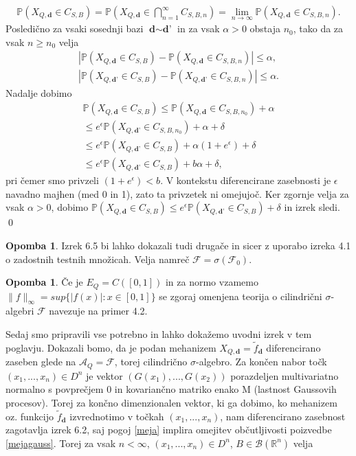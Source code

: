 \documentclass[12pt,a4paper]{amsart}
\theoremstyle{definition} %
\newtheorem{opomba}[definicija]{Opomba}
\theoremstyle{plain} %
\begin{document}
\begin{gather*}
\mathbb{P}(X_{Q,\textbf{d}} \in C_{S,B}) = \mathbb{P}(X_{Q,\textbf{d}} \in  \bigcap_{n=1}^{\infty}C_{S,B,n}) = \lim_{n \rightarrow \infty} \mathbb{P}(X_{Q,\textbf{d}} \in C_{S,B,n}).
\end{gather*}
Posledično za vsaki sosednji bazi $\textbf{d} \sim \textbf{d'}$ in za vsak $\alpha > 0$ obstaja $n_0$, tako da za vsak $n \geq n_0$ velja
\begin{gather*}
|\mathbb{P}(X_{Q,\textbf{d}} \in C_{S,B}) - \mathbb{P}(X_{Q,\textbf{d}} \in C_{S,B,n})| \leq  \alpha, \\ |\mathbb{P}(X_{Q,\textbf{d'}} \in C_{S,B}) - \mathbb{P}(X_{Q,\textbf{d'}} \in C_{S,B,n})| \leq \alpha.
\end{gather*}
Nadalje dobimo
\begin{gather*}
\mathbb{P}(X_{Q,\textbf{d}} \in C_{S,B})  \leq \mathbb{P}(X_{Q,\textbf{d}} \in C_{S,B, n_0}) + \alpha \\ \leq e^{\epsilon} \mathbb{P}(X_{Q,\textbf{d'}} \in C_{S,B,n_0})  + \alpha + \delta \\ \leq e^{\epsilon} \mathbb{P}(X_{Q,\textbf{d'}} \in C_{S,B})  + \alpha(1 + e^{\epsilon}) + \delta \\ \leq e^{\epsilon} \mathbb{P}(X_{Q,\textbf{d'}} \in C_{S,B})  + b \alpha + \delta,
\end{gather*}
pri čemer smo privzeli $(1+e^{\epsilon}) < b$. V kontekstu diferencirane zasebnosti je $\epsilon$ navadno majhen (med 0 in 1), zato ta privzetek ni omejujoč. Ker zgornje velja za vsak $\alpha > 0$, dobimo $\mathbb{P}(X_{Q,\textbf{d}} \in C_{S,B}) \leq e^{\epsilon} \mathbb{P}(X_{Q,\textbf{d'}} \in C_{S,B}) + \delta$ in izrek sledi.
\qed
\newline
\begin{opomba}
Izrek 6.5 bi lahko dokazali tudi drugače in sicer z uporabo izreka 4.1 o zadostnih testnih množicah. Velja namreč $\mathcal{F} = \sigma(\mathcal{F}_0).$
\end{opomba}
\begin{opomba}
Če je $E_Q = C ([0,1])$ in za normo vzamemo $\|f\|_{\infty} = sup\{|f(x)| : x \in [0,1]\}$ se zgoraj omenjena teorija o cilindrični $\sigma$-algebri $\mathcal{F}$ navezuje na primer 4.2.
\end{opomba}
Sedaj smo pripravili vse potrebno in lahko dokažemo uvodni izrek v tem poglavju.
Dokazali bomo, da je podan mehanizem $X_{Q,\textbf{d}} = \tilde{f}_{\textbf{d}}$ diferencirano zaseben glede na $\mathcal{A}_Q = \mathcal{F}$, torej cilindrično $\sigma$-algebro. Za končen nabor točk $(x_1,...,x_n) \in D^n$ je vektor $(G(x_1),...,G(x_2))$ porazdeljen multivariatno normalno s povprečjem 0 in kovariančno matriko enako M (lastnost Gaussovih procesov). Torej za končno dimenzionalen vektor, ki ga dobimo, ko mehanizem oz. funkcijo $\tilde{f}_{\textbf{d}}$ izvrednotimo v točkah $(x_1,...,x_n) $, nam diferencirano zasebnost zagotavlja izrek 6.2, saj pogoj \eqref{meja} implira omejitev občutljivosti poizvedbe \eqref{mejagauss}. Torej za vsak $n < \infty$, $(x_1,...,x_n) \in D^n$, $B \in \mathcal{B}(\mathbb{R}^n)$ velja
\end{document}
